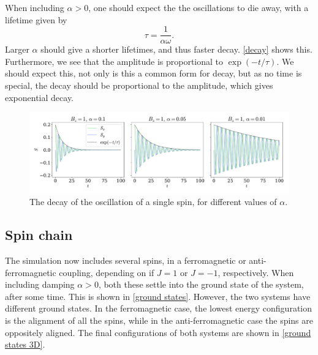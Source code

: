 \documentclass{article}
\begin{document}
    When including $\alpha > 0$, one should expect the the oscillations to die away, with a lifetime given by
    \begin{equation*}
        \tau = \frac{1}{\alpha \omega}.
    \end{equation*}
    Larger $\alpha$ should give a shorter lifetimes, and thus faster decay.
    \autoref{decay} shows this.
    Furthermore, we see that the amplitude is proportional to $\exp(-t/\tau)$.
    We should expect this, not only is this a common form for decay, but as no time is special, the decay should be proportional to the amplitude, which gives exponential decay.

    \begin{figure}[H]
        \centering
        \includegraphics[width=\textwidth]{../plots/decay_a.pdf}
        \caption{The decay of the oscillation of a single spin, for different values of $\alpha$.}
        \label{decay}
    \end{figure}

    \subsection*{Spin chain}
    The simulation now includes several spins, in a ferromagnetic or anti-ferromagnetic coupling, depending on if $J = 1$ or $J = -1$, respectively.
    When including damping $\alpha > 0$, both these settle into the ground state of the system, after some time.
    This is shown in \autoref{ground states}.
    However, the two systems have different ground states.
    In the ferromagnetic case, the lowest energy configuration is the alignment of all the spins, while in the anti-ferromagnetic case the spins are oppositely aligned.
    The final configurations of both systems are shown in \autoref{ground states 3D}.
\end{document}
